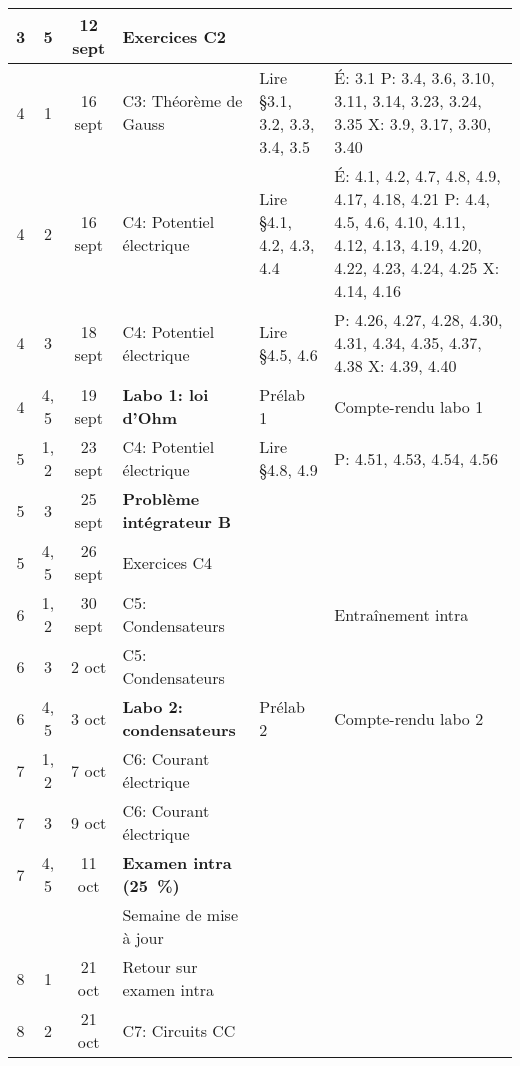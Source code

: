 \documentclass[10pt]{article}
\begin{document}
\begin{longtable}{cccp{6cm}lp{9cm}}
  3     &  5     &  12 sept   &  Exercices C2  \\
  \midrule
  4     &  1  &  16 sept    &  C3: Théorème de Gauss
    & Lire \S 3.1, 3.2, 3.3, 3.4, 3.5 
    &  É: 3.1 \newline 
       P: 3.4, 3.6, 3.10, 3.11, 3.14, 3.23, 3.24, 3.35 \newline
       X: 3.9, 3.17, 3.30, 3.40 \\
  4     &  2  &  16 sept   &  C4: Potentiel électrique
    & Lire \S 4.1, 4.2, 4.3, 4.4
    & É: 4.1, 4.2, 4.7, 4.8, 4.9, 4.17, 4.18, 4.21  \newline 
      P: 4.4, 4.5, 4.6, 4.10, 4.11, 4.12, 4.13, 4.19, 4.20, 4.22, 4.23, 4.24, 4.25 \newline 
      X: 4.14, 4.16 \newline \\
  4     &  3     &  18 sept   &  C4: Potentiel électrique
    & Lire \S 4.5, 4.6
    & P: 4.26, 4.27, 4.28, 4.30, 4.31, 4.34, 4.35, 4.37, 4.38 \newline
      X: 4.39, 4.40 \\
  4     &  4, 5  &  19 sept   &  \textbf{Labo 1: loi d'Ohm}
    &  Prélab 1  &  Compte-rendu labo 1 \\
  \midrule
  5     &  1, 2  &  23 sept  &  C4: Potentiel électrique
    & Lire \S 4.8, 4.9
    & P: 4.51, 4.53, 4.54, 4.56  \\
  5     &  3     &  25 sept  &  \textbf{Problème intégrateur B}  \\
  5     &  4, 5  &  26 sept  &  Exercices C4
    &    &   \\
  \midrule
  6     &  1, 2  &  30 sept  &  C5: Condensateurs
    &  &  Entraînement intra  \\
  6     &  3     &  2 oct    &  C5: Condensateurs  \\
  6     &  4, 5  &  3 oct    &  \textbf{Labo 2: condensateurs}
    &  Prélab 2  &  Compte-rendu labo 2 \\
  \midrule
  7     &  1, 2  &  7 oct    &  C6: Courant électrique  \\
  7     &  3     &  9 oct    &  C6: Courant électrique  \\
  7     &  4, 5  &  11 oct   &  \textbf{Examen intra (\qty{25}{\percent})}
    &    &   \\
  \midrule
        &        &           &  Semaine de mise à jour  \\
  \midrule
  8     &  1     &  21 oct   &  Retour sur examen intra  \\
  8     &  2     &  21 oct   &  C7: Circuits CC  \\

\end{longtable}
\end{document}
